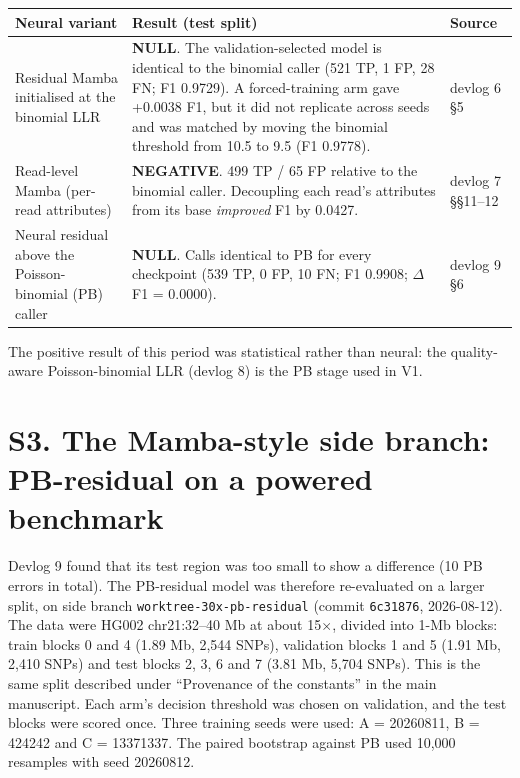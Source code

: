 \documentclass[11pt,a4paper]{article}
\newcommand{\src}[1]{{\small\texttt{#1}}}
\begin{document}
\begin{center}\small
\begin{tabular}{>{\raggedright}p{4.3cm}>{\raggedright}p{6.2cm}p{4.6cm}}
\toprule
Neural variant & Result (test split) & Source \\
\midrule
Residual Mamba initialised at the binomial LLR &
\textbf{NULL}. The validation-selected model is identical to the binomial caller (521 TP, 1 FP,
28 FN; F1 0.9729). A forced-training arm gave +0.0038 F1, but it did not replicate across seeds
and was matched by moving the binomial threshold from 10.5 to 9.5 (F1 0.9778). & devlog 6 \S5 \\
\addlinespace
Read-level Mamba (per-read attributes) &
\textbf{NEGATIVE}. 499 TP / 65 FP relative to the binomial caller. Decoupling each read's
attributes from its base \emph{improved} F1 by 0.0427. & devlog 7 \S\S11--12 \\
\addlinespace
Neural residual above the Poisson-binomial (PB) caller &
\textbf{NULL}. Calls identical to PB for every checkpoint (539 TP, 0 FP, 10 FN; F1 0.9908;
$\Delta$F1 = 0.0000). & devlog 9 \S6 \\
\bottomrule
\end{tabular}
\end{center}

The positive result of this period was statistical rather than neural: the quality-aware
Poisson-binomial LLR (devlog 8) is the PB stage used in V1.

\section{S3. The Mamba-style side branch: PB-residual on a powered benchmark}

Devlog 9 found that its test region was too small to show a difference (10 PB errors in total).
The PB-residual model was therefore re-evaluated on a larger split, on side branch
\src{worktree-30x-pb-residual} (commit \src{6c31876}, 2026-08-12). The data were HG002
chr21:32--40 Mb at about 15$\times$, divided into 1-Mb blocks: train blocks 0 and 4 (1.89 Mb,
2,544 SNPs), validation blocks 1 and 5 (1.91 Mb, 2,410 SNPs) and test blocks 2, 3, 6 and 7
(3.81 Mb, 5,704 SNPs). This is the same split described under ``Provenance of the constants'' in
the main manuscript. Each arm's decision threshold was chosen on validation, and the test blocks
were scored once. Three training seeds were used: A = 20260811, B = 424242 and C = 13371337. The
paired bootstrap against PB used 10,000 resamples with seed 20260812.
\end{document}
